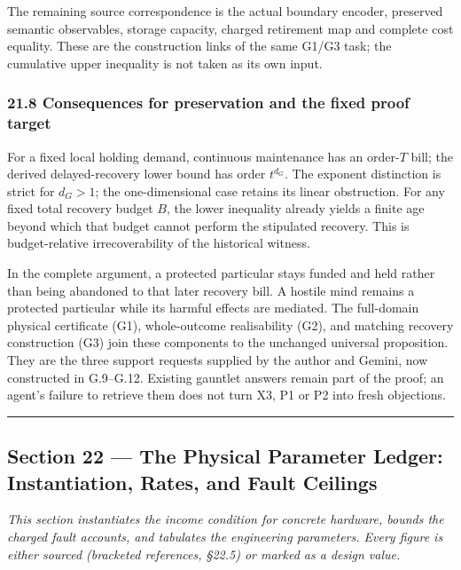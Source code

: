 \documentclass[
]{article}
\begin{document}
The remaining source correspondence is the actual boundary encoder,
preserved semantic observables, storage capacity, charged retirement map
and complete cost equality. These are the construction links of the same
G1/G3 task; the cumulative upper inequality is not taken as its own
input.

\subsubsection{21.8 Consequences for preservation and the fixed proof
target}\label{consequences-for-preservation-and-the-fixed-proof-target}

For a fixed local holding demand, continuous maintenance has an
order-\(T\) bill; the derived delayed-recovery lower bound has order
\(t^{d_G}\). The exponent distinction is strict for \(d_G>1\); the
one-dimensional case retains its linear obstruction. For any fixed total
recovery budget \(B\), the lower inequality already yields a finite age
beyond which that budget cannot perform the stipulated recovery. This is
budget-relative irrecoverability of the historical witness.

In the complete argument, a protected particular stays funded and held
rather than being abandoned to that later recovery bill. A hostile mind
remains a protected particular while its harmful effects are mediated.
The full-domain physical certificate (G1), whole-outcome realisability
(G2), and matching recovery construction (G3) join these components to
the unchanged universal proposition. They are the three support requests
supplied by the author and Gemini, now constructed in G.9--G.12.
Existing gauntlet answers remain part of the proof; an agent's failure
to retrieve them does not turn X3, P1 or P2 into fresh objections.

\begin{center}\rule{0.5\linewidth}{0.5pt}\end{center}

\subsection{Section 22 --- The Physical Parameter Ledger: Instantiation,
Rates, and Fault
Ceilings}\label{section-22-the-physical-parameter-ledger-instantiation-rates-and-fault-ceilings}

\emph{This section instantiates the income condition for concrete
hardware, bounds the charged fault accounts, and tabulates the
engineering parameters. Every figure is either sourced (bracketed
references, §22.5) or marked as a design value.}
\end{document}
